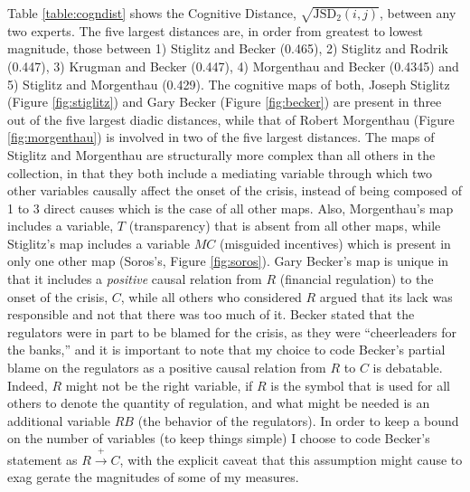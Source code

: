 \documentclass[11pt]{article}
\begin{document}
Table \ref{table:cogndist} shows the Cognitive Distance, $\sqrt{\text{JSD}_2(i, j)}$, between any two experts. The five largest distances are, in order from greatest to lowest magnitude, those between 1) Stiglitz and Becker (0.465), 2) Stiglitz and Rodrik (0.447), 3) Krugman and Becker (0.447), 4) Morgenthau and Becker (0.4345) and 5) Stiglitz and Morgenthau (0.429). The cognitive maps of both, Joseph Stiglitz (Figure \ref{fig:stiglitz}) and Gary Becker (Figure \ref{fig:becker}) are present in three out of the five largest diadic distances, while that of Robert Morgenthau (Figure \ref{fig:morgenthau}) is involved in two of the five largest distances. The maps of Stiglitz and Morgenthau are structurally more complex than all others in the collection, in that they both include a mediating variable through which two other variables causally affect the onset of the crisis, instead of being composed of 1 to 3 direct causes which is the case of all other maps. Also, Morgenthau's map includes a variable, $T$ (transparency) that is absent from all other maps, while Stiglitz's map includes a variable $MC$ (misguided incentives) which is present in only one other map (Soros's, Figure \ref{fig:soros}). Gary Becker's map is unique in that it includes a \emph{positive} causal relation from $R$ (financial regulation) to the onset of the crisis, $C$, while all others who considered $R$ argued that its lack was responsible and not that there was too much of it. Becker stated that the regulators were in part to be blamed for the crisis, as they were ``cheerleaders for the banks,'' and it is important to note that my choice to code Becker's partial blame on the regulators as a positive causal relation from $R$ to $C$ is debatable. Indeed, $R$ might not be the right variable, if $R$ is the symbol that is used for all others to denote the quantity of regulation, and what might be needed is an additional variable $RB$ (the behavior of the regulators). In order to keep a bound on the number of variables (to keep things simple) I choose to code Becker's statement as $R \xrightarrow{+} C$, with the explicit caveat that this assumption might cause to exag
gerate the magnitudes of some of my measures.
\end{document}
